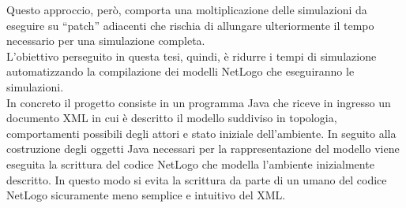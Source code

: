 Questo approccio, però, comporta una moltiplicazione delle simulazioni da eseguire su “patch” adiacenti che rischia di allungare ulteriormente il tempo necessario per una simulazione completa.\\
L'obiettivo perseguito in questa tesi, quindi, è ridurre i tempi di simulazione automatizzando la compilazione dei modelli NetLogo che eseguiranno le simulazioni.\\
In concreto il progetto consiste in un programma Java che riceve in ingresso un documento XML in cui è descritto il modello suddiviso in topologia, comportamenti possibili degli attori e stato iniziale dell'ambiente. In seguito alla costruzione degli oggetti Java necessari per la rappresentazione del modello viene eseguita la scrittura del codice NetLogo che modella l'ambiente inizialmente descritto. In questo modo si evita la scrittura da parte di un umano del codice NetLogo sicuramente meno semplice e intuitivo del XML.
 